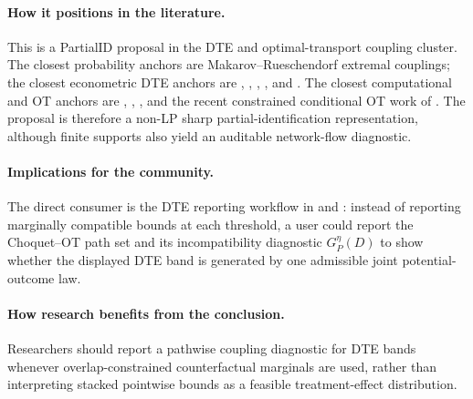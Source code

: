\documentclass[11pt]{article}
\theoremstyle{definition}
\theoremstyle{plain}
\theoremstyle{remark}
\begin{document}
\paragraph{How it positions in the literature.}
This is a PartialID proposal in the DTE and optimal-transport coupling cluster.  The
closest probability anchors are Makarov--Rueschendorf extremal couplings; the closest
econometric DTE anchors are \citet{FanPark2010}, \citet{FirpoRidder2019},
\citet{FanWu2010}, \citet{Lee2024}, and \citet{FanGuerreZhu2017}.  The closest computational and OT anchors are
\citet{Russell2021}, \citet{OberReynolds2023}, \citet{FanPassShi2025}, and the recent
constrained conditional OT work of \citet{TanBlanchetSyrgkanis2026}.  The proposal is
therefore a non-LP sharp partial-identification representation, although finite supports
also yield an auditable network-flow diagnostic.

\paragraph{Implications for the community.}
The direct consumer is the DTE reporting workflow in \citet{FanPark2010} and
\citet{FrandsenLefgren2021}: instead of reporting marginally compatible bounds at each
threshold, a user could report the Choquet--OT path set and its incompatibility
diagnostic \(G^\eta_P(D)\) to show whether the displayed DTE band is generated by one
admissible joint potential-outcome law.

\paragraph{How research benefits from the conclusion.}
Researchers should report a pathwise coupling diagnostic for DTE bands whenever
overlap-constrained counterfactual marginals are used, rather than interpreting stacked
pointwise bounds as a feasible treatment-effect distribution.
\end{document}
